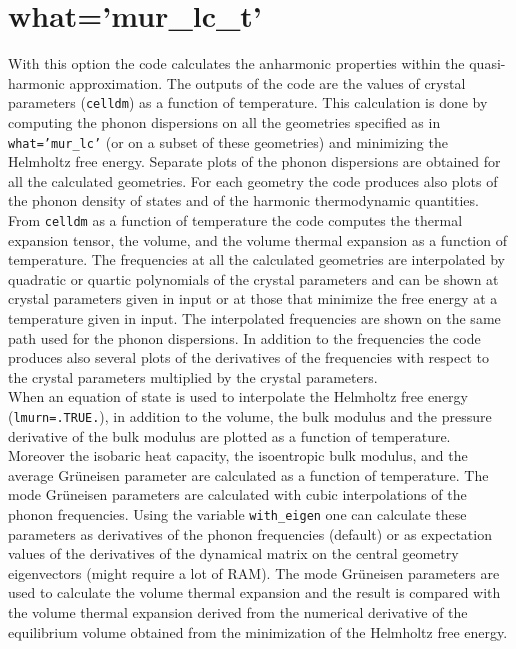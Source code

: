 \documentclass[12pt,a4paper,twoside]{report}
\begin{document}
\newpage
{\color{coral}\section{what='mur\_lc\_t'}}
\color{black}
With this option the code calculates the anharmonic 
properties within the quasi-harmonic approximation. 
The outputs of the code are the values of crystal parameters 
(\texttt{celldm}) as a function of temperature. This calculation is done 
by computing the phonon dispersions on all the geometries specified as in
\texttt{what='mur\_lc'} (or on a subset of these geometries) and 
minimizing the Helmholtz free energy.
Separate plots of the phonon dispersions are obtained for all the 
calculated geometries.
For each geometry the code produces also plots of the phonon density
of states and of the harmonic thermodynamic quantities.
From \texttt{celldm} as a function of temperature the code computes the thermal
expansion tensor, the volume, and the volume thermal expansion as a 
function of temperature. 
The frequencies at all the calculated geometries are interpolated
by quadratic or quartic polynomials of the crystal parameters
and can be shown at crystal parameters given in input or at those that
minimize the free energy at a temperature given in input. The 
interpolated frequencies  
are shown on the same path used for the phonon dispersions.
In addition to the frequencies the code produces also several plots of
the derivatives of the frequencies with respect to the crystal parameters
multiplied by the crystal parameters. \\
When an equation of state is used to interpolate the
Helmholtz free energy (\texttt{lmurn=.TRUE.}), in addition to the volume, 
the bulk modulus and the pressure derivative of the bulk modulus are 
plotted as a function of 
temperature. Moreover the isobaric heat capacity, the isoentropic 
bulk modulus, and the average Gr\"uneisen parameter are calculated as 
a function of temperature.
The mode Gr\"uneisen parameters are calculated with cubic interpolations of the
phonon frequencies. Using the variable \texttt{with\_eigen} one can 
calculate these parameters as derivatives of the phonon frequencies 
(default) or as expectation values of the derivatives of the dynamical 
matrix on the central geometry eigenvectors (might require a lot of RAM). 
The mode Gr\"uneisen parameters are used to calculate the volume
thermal expansion and the result is compared with the volume thermal expansion
derived from the numerical derivative of the equilibrium volume obtained
from the minimization of the Helmholtz free energy. 
\end{document}
